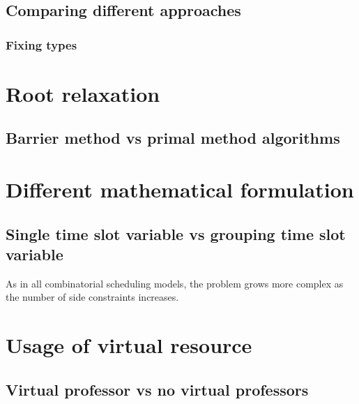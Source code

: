 \subsection{Comparing different approaches}

\subsubsection{Fixing types}




\section{Root relaxation}

\subsection{Barrier method vs primal method algorithms}




\section{Different mathematical formulation}

\subsection{Single time slot variable vs grouping time slot variable}



As in all combinatorial scheduling models, the problem grows more complex as the number of side constraints increases.



\section{Usage of virtual resource}

\subsection{Virtual professor vs no virtual professors}

